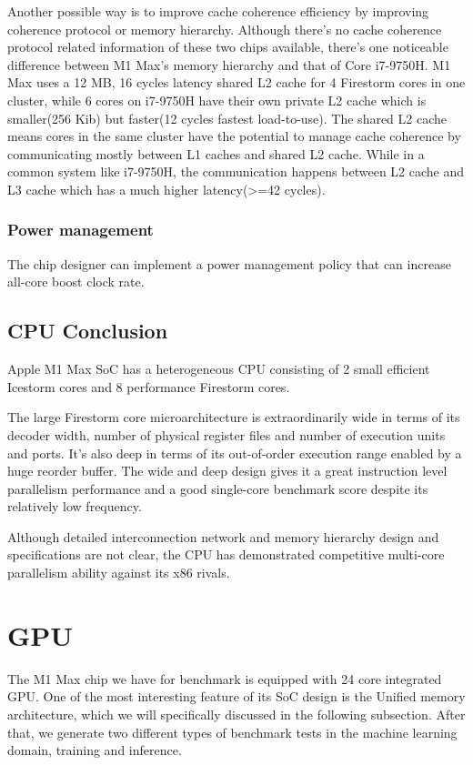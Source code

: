 \documentclass[11pt]{article}
\begin{document}
Another possible way is to improve cache coherence efficiency by improving coherence protocol or memory hierarchy. 
Although there’s no cache coherence protocol related information of these two chips available, there’s one noticeable difference between M1 Max’s memory hierarchy and that of Core i7-9750H. M1 Max uses a 12 MB, 16 cycles latency shared L2 cache for 4 Firestorm cores in one cluster, while 6 cores on i7-9750H have their own private L2 cache which is smaller(256 Kib) but faster(12 cycles fastest load-to-use). The shared L2 cache means cores in the same cluster have the potential to manage cache coherence by communicating mostly between L1 caches and shared L2 cache. While in a common system like i7-9750H, the communication happens between L2 cache and L3 cache which has a much higher latency(>=42 cycles).
\subsubsection*{Power management}
The chip designer can implement a power management policy that can increase all-core boost clock rate. 
\subsection*{CPU Conclusion}
Apple M1 Max SoC has a heterogeneous CPU consisting of 2 small efficient Icestorm cores and 8 performance Firestorm cores. 

The large Firestorm core microarchitecture is extraordinarily wide in terms of its decoder width, number of physical register files and number of execution units and ports. It’s also deep in terms of its out-of-order execution range enabled by a huge reorder buffer.  The wide and deep design gives it a great instruction level parallelism performance and a good single-core benchmark score despite its relatively low frequency.

Although detailed interconnection network and memory hierarchy design and specifications are not clear, the CPU has demonstrated competitive multi-core parallelism ability against its x86 rivals. 
\newpage
\section{GPU}
The M1 Max chip we have for benchmark is equipped with 24 core integrated GPU. One of the most interesting feature of its SoC design is the Unified memory architecture, which we will specifically discussed in the following subsection. After that, we generate two different types of benchmark tests in the machine learning domain, training and inference.
\end{document}
